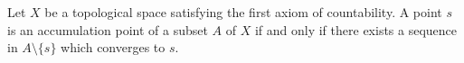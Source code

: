 Let $X$ be a topological space satisfying the first axiom of countability. A point $s$ is an accumulation point of a subset $A$ of $X$ if and only if there exists a sequence in $A \setminus \{s\}$ which converges to $s$.

